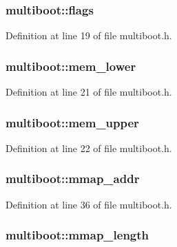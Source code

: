 \hypertarget{structmultiboot_abed318746af32b1d0f5f2a50cbffb8ca}{
\subsubsection[{flags}]{ {\bf multiboot::flags}}}
\label{structmultiboot_abed318746af32b1d0f5f2a50cbffb8ca}


Definition at line 19 of file multiboot.h.

\hypertarget{structmultiboot_a89507e64378274e21a65bccbf9b1555c}{
\subsubsection[{mem\_\-lower}]{ {\bf multiboot::mem\_\-lower}}}
\label{structmultiboot_a89507e64378274e21a65bccbf9b1555c}


Definition at line 21 of file multiboot.h.

\hypertarget{structmultiboot_a85ca5ccd7531e8154578376669e9041e}{
\subsubsection[{mem\_\-upper}]{ {\bf multiboot::mem\_\-upper}}}
\label{structmultiboot_a85ca5ccd7531e8154578376669e9041e}


Definition at line 22 of file multiboot.h.

\hypertarget{structmultiboot_a5780510a3936095477e4fc619f780f48}{
\subsubsection[{mmap\_\-addr}]{ {\bf multiboot::mmap\_\-addr}}}
\label{structmultiboot_a5780510a3936095477e4fc619f780f48}


Definition at line 36 of file multiboot.h.

\hypertarget{structmultiboot_abef7b0d5a6e80b2b25215a133d71fc3b}{
\subsubsection[{mmap\_\-length}]{ {\bf multiboot::mmap\_\-length}}}
\label{structmultiboot_abef7b0d5a6e80b2b25215a133d71fc3b}


